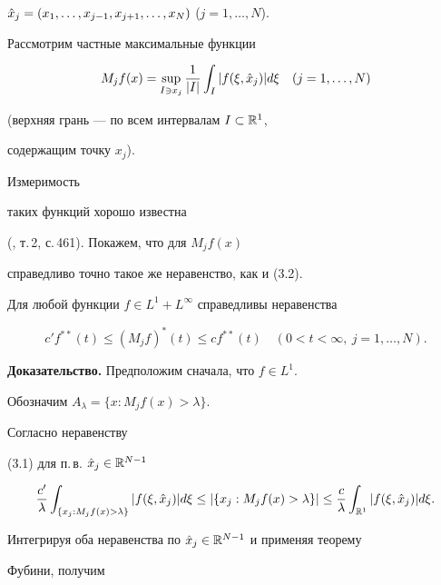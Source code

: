 $\Hat x_j=(x_1,\dotsc,x_{j-1},x_{j+1},\dotsc,x_N)$ ($j=1,\dotsc,N$).


Рассмотрим частные максимальные функции 


$$ 


M_j f(x)=\sup_{I\ni x_j}\frac{1}{|I|}\int_I |f(\xi,\Hat x_j)|d\xi 


\quad (j=1,\dotsc,N) 


$$ 


(верхняя грань --- по всем интервалам $I\subset\Bbb R^1$, 


содержащим точку $x_j$). 


Измеримость 


таких функций хорошо известна 


(\cite{Zyg}, т.\,2, с.\,461). Покажем, что для $M_j f(x)$ 


справедливо точно такое же неравенство, как и (3.2). 


 


\begin{lem} Для любой функции $f\in L^1+L^\infty$ справедливы неравенства 


\begin{equation} 


c'f^{**}(t)\le (M_j f)^*(t) \le cf^{**}(t) 


\quad (0<t<\infty, \ j=1,\dotsc,N). 


\end{equation} 


\end{lem}


 


{\bf Доказательство.} Предположим сначала, что $f\in L^1$. 


Обозначим $A_\lambda=\{x:M_j f(x)>\lambda\}$.


Согласно неравенству 


(3.1) для п.\,в. $\Hat x_j\in\Bbb R^{N-1}$ 


$$ 


\frac{c'}{\lambda}\int_{\{x_j:M_j f(x)>\lambda\}} |f(\xi,\Hat x_j)|d\xi 


\le |\{x_j:M_j f(x)>\lambda\}| \le \frac{c}{\lambda} 


\int_{\Bbb R^1}|f(\xi,\Hat x_j)|d\xi. 


$$ 


Интегрируя оба неравенства по $\Hat x_j\in \Bbb R^{N-1}$ и применяя теорему 


Фубини, получим 



